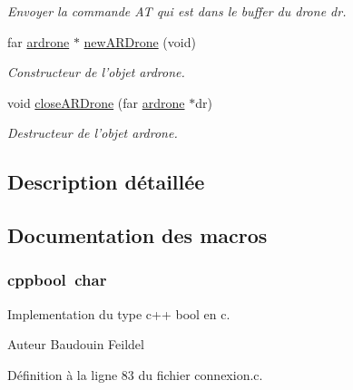 \begin{DoxyCompactItemize}
\begin{DoxyCompactList}\small\item\em Envoyer la commande A\-T qui est dans le buffer du drone dr. \end{DoxyCompactList}\item 
far \hyperlink{structardrone}{ardrone} $\ast$ \hyperlink{group___a_t_commands_ga6f1e46bbcb882594c8442c75ae3dedf8}{new\-A\-R\-Drone} (void)
\begin{DoxyCompactList}\small\item\em Constructeur de l'objet ardrone. \end{DoxyCompactList}\item 
void \hyperlink{group___a_t_commands_gad550dbbb88a791f7e8d64c801ce06bf6}{close\-A\-R\-Drone} (far \hyperlink{structardrone}{ardrone} $\ast$dr)
\begin{DoxyCompactList}\small\item\em Destructeur de l'objet ardrone. \end{DoxyCompactList}\end{DoxyCompactItemize}


\subsection{Description détaillée}


\subsection{Documentation des macros}
\hypertarget{group___a_t_commands_ga58b930fb43c5cd2fc89a84647e6fe51c}{
\subsubsection[{cppbool}]{\setlength{\rightskip}{0pt plus 5cm}cppbool~char}}\label{group___a_t_commands_ga58b930fb43c5cd2fc89a84647e6fe51c}


Implementation du type c++ bool en c. 

\begin{DoxyAuthor}{Auteur}
Baudouin Feildel 
\end{DoxyAuthor}


Définition à la ligne 83 du fichier connexion.\-c.



